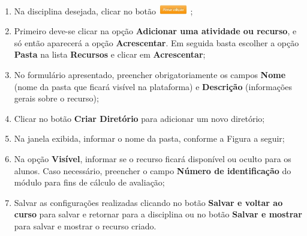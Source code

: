 \begin{enumerate}
\item Na disciplina desejada, clicar no botão \includegraphics[width=0.1\textwidth]{imagem/cap4/fig18.jpg} ;
\item Primeiro deve-se clicar na opção \textbf{Adicionar uma atividade ou recurso}, e só então aparecerá a opção \textbf{Acrescentar}. Em seguida basta escolher a opção \textbf{Pasta} na lista \textbf{Recursos} e clicar em \textbf{Acrescentar};

     \begin{center}
     \end{center}

\item No formulário apresentado, preencher obrigatoriamente os campos \textbf{Nome} (nome da pasta que ficará visível na plataforma) e \textbf{Descrição} (informações gerais sobre o recurso);
\item Clicar no botão \textbf{Criar Diretório}  para adicionar um novo diretório;
\item Na janela exibida, informar o nome da pasta, conforme a Figura a seguir;

         \begin{center}
         \end{center}
\item Na opção \textbf{Visível}, informar se o recurso ficará disponível ou oculto para os alunos. Caso necessário, preencher o campo\textbf{ Número de identificação }do módulo para fins de cálculo de avaliação;
\item Salvar as configurações realizadas clicando no botão \textbf{Salvar e voltar ao curso } para salvar e retornar para a disciplina ou no botão \textbf{Salvar e mostrar } para salvar e mostrar o recurso criado.
\end{enumerate}



